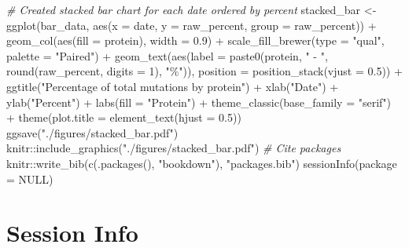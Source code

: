 \documentclass{article}
\newenvironment{Shaded}{\begin{snugshade}}{\end{snugshade}}
\newcommand{\AttributeTok}[1]{\textcolor[rgb]{0.77,0.63,0.00}{#1}}
\newcommand{\CommentTok}[1]{\textcolor[rgb]{0.56,0.35,0.01}{\textit{#1}}}
\newcommand{\ConstantTok}[1]{\textcolor[rgb]{0.00,0.00,0.00}{#1}}
\newcommand{\DecValTok}[1]{\textcolor[rgb]{0.00,0.00,0.81}{#1}}
\newcommand{\FloatTok}[1]{\textcolor[rgb]{0.00,0.00,0.81}{#1}}
\newcommand{\FunctionTok}[1]{\textcolor[rgb]{0.00,0.00,0.00}{#1}}
\newcommand{\NormalTok}[1]{#1}
\newcommand{\OtherTok}[1]{\textcolor[rgb]{0.56,0.35,0.01}{#1}}
\newcommand{\SpecialCharTok}[1]{\textcolor[rgb]{0.00,0.00,0.00}{#1}}
\newcommand{\StringTok}[1]{\textcolor[rgb]{0.31,0.60,0.02}{#1}}
\begin{document}
\begin{Shaded}
\begin{Highlighting}[]
\CommentTok{\# Created stacked bar chart for each date ordered by percent}
\NormalTok{stacked\_bar }\OtherTok{\textless{}{-}} \FunctionTok{ggplot}\NormalTok{(bar\_data, }\FunctionTok{aes}\NormalTok{(}\AttributeTok{x =}\NormalTok{ date, }\AttributeTok{y =}\NormalTok{ raw\_percent, }\AttributeTok{group =}\NormalTok{ raw\_percent)) }\SpecialCharTok{+}
    \FunctionTok{geom\_col}\NormalTok{(}\FunctionTok{aes}\NormalTok{(}\AttributeTok{fill =}\NormalTok{ protein), }\AttributeTok{width =} \FloatTok{0.9}\NormalTok{) }\SpecialCharTok{+} \FunctionTok{scale\_fill\_brewer}\NormalTok{(}\AttributeTok{type =} \StringTok{"qual"}\NormalTok{,}
    \AttributeTok{palette =} \StringTok{"Paired"}\NormalTok{) }\SpecialCharTok{+} \FunctionTok{geom\_text}\NormalTok{(}\FunctionTok{aes}\NormalTok{(}\AttributeTok{label =} \FunctionTok{paste0}\NormalTok{(protein, }\StringTok{" {-} "}\NormalTok{, }\FunctionTok{round}\NormalTok{(raw\_percent,}
    \AttributeTok{digits =} \DecValTok{1}\NormalTok{), }\StringTok{"\%"}\NormalTok{)), }\AttributeTok{position =} \FunctionTok{position\_stack}\NormalTok{(}\AttributeTok{vjust =} \FloatTok{0.5}\NormalTok{)) }\SpecialCharTok{+} \FunctionTok{ggtitle}\NormalTok{(}\StringTok{"Percentage of total mutations by protein"}\NormalTok{) }\SpecialCharTok{+}
    \FunctionTok{xlab}\NormalTok{(}\StringTok{"Date"}\NormalTok{) }\SpecialCharTok{+} \FunctionTok{ylab}\NormalTok{(}\StringTok{"Percent"}\NormalTok{) }\SpecialCharTok{+} \FunctionTok{labs}\NormalTok{(}\AttributeTok{fill =} \StringTok{"Protein"}\NormalTok{) }\SpecialCharTok{+} \FunctionTok{theme\_classic}\NormalTok{(}\AttributeTok{base\_family =} \StringTok{"serif"}\NormalTok{) }\SpecialCharTok{+}
    \FunctionTok{theme}\NormalTok{(}\AttributeTok{plot.title =} \FunctionTok{element\_text}\NormalTok{(}\AttributeTok{hjust =} \FloatTok{0.5}\NormalTok{))}
\FunctionTok{ggsave}\NormalTok{(}\StringTok{"./figures/stacked\_bar.pdf"}\NormalTok{)}
\NormalTok{knitr}\SpecialCharTok{::}\FunctionTok{include\_graphics}\NormalTok{(}\StringTok{"./figures/stacked\_bar.pdf"}\NormalTok{)}
\CommentTok{\# Cite packages}
\NormalTok{knitr}\SpecialCharTok{::}\FunctionTok{write\_bib}\NormalTok{(}\FunctionTok{c}\NormalTok{(}\FunctionTok{.packages}\NormalTok{(), }\StringTok{"bookdown"}\NormalTok{), }\StringTok{"packages.bib"}\NormalTok{)}
\FunctionTok{sessionInfo}\NormalTok{(}\AttributeTok{package =} \ConstantTok{NULL}\NormalTok{)}
\end{Highlighting}
\end{Shaded}

\hypertarget{session-info}{%
\section{Session Info}\label{session-info}}
\end{document}
